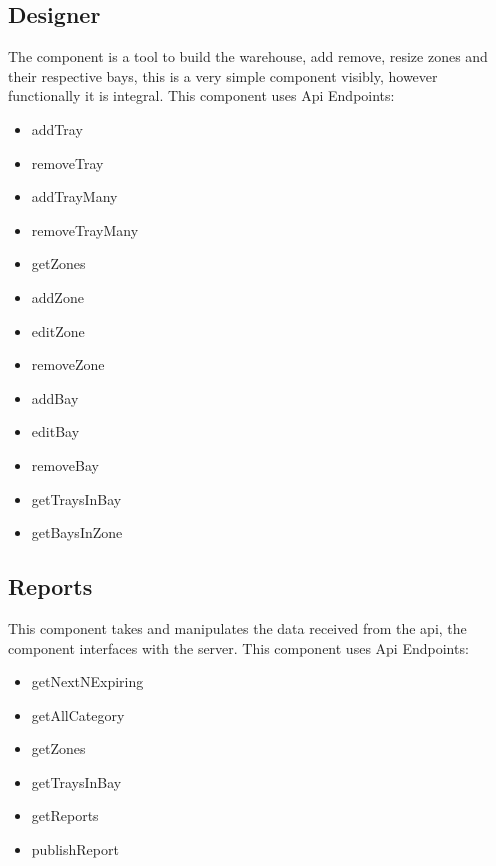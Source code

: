 \documentclass[letterpaper,10pt,english]{sphinxmanual}
\let\oldsubsection\subsection
\renewcommand{\subsection}{\needspace{6\baselineskip}\oldsubsection}
\begin{document}
\subsection{Designer}
\label{\detokenize{docs/System_Overview/Frontend_overview:designer}}
The component is a tool to build the warehouse, add remove, resize zones
and their respective bays, this is a very simple component visibly,
however functionally it is integral. This component uses Api Endpoints:
\begin{itemize}
\item {} 
addTray

\item {} 
removeTray

\item {} 
addTrayMany

\item {} 
removeTrayMany

\item {} 
getZones

\item {} 
addZone

\item {} 
editZone

\item {} 
removeZone

\item {} 
addBay

\item {} 
editBay

\item {} 
removeBay

\item {} 
getTraysInBay

\item {} 
getBaysInZone

\end{itemize}


\subsection{Reports}
\label{\detokenize{docs/System_Overview/Frontend_overview:reports}}
This component takes and manipulates the data received from the api, the
component interfaces with the server. This component uses Api Endpoints:
\begin{itemize}
\item {} 
getNextNExpiring

\item {} 
getAllCategory

\item {} 
getZones

\item {} 
getTraysInBay

\item {} 
getReports

\item {} 
publishReport

\end{itemize}
\end{document}
